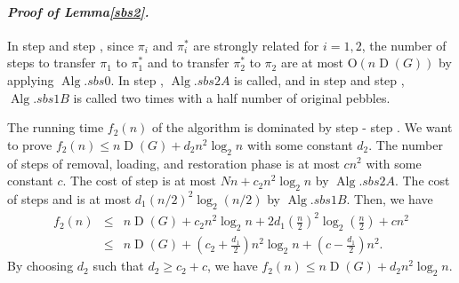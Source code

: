 \documentclass[letter,11pt]{article}
\newcommand{\white}{\qquad{\framebox{\rule{0pt}{4pt}}}}
\newcommand{\owari}{\hfill\white}
\theoremstyle{definition}
\theoremstyle{definition}
\DeclareMathOperator{\Alg}{Alg}
\DeclareMathOperator{\D}{D}
\newcommand{\1}{\boldmath$~1~$\unboldmath}
\newcommand{\Ord}{\mathrm{O}}
\newcommand{\qedgo}{\vspace{0.35cm}}
\newcommand{\tume}{\hspace*{0.2em}}
\newcommand{\maru}[1]{{\ooalign{\hfill$\small#1$\hfill\crcr\scalebox{1.3}{$\bigcirc$}}}}
\newenvironment{Proofof}[1]{\expandafter
\paragraph{{\it Proof of #1.}}}{\hspace{5mm}\owari\qedgo}
\begin{document}
\begin{Proofof}{Lemma\tume\ref{sbs2}}
In step \maru{2} and step \maru{7}, since $\pi_i$ and $\pi_i^{\ast}$ are strongly related for $i = 1, 2$, the number of steps to transfer $\pi_1$ to $\pi_1^{\ast}$ and to transfer $\pi_2^{\ast}$ to $\pi_2$ are at most $\Ord (n\D(G))$ by applying $\Alg.sbs0$.
In step \maru{3}, $\Alg.sbs2A$ is called, and 
in step \maru{4} and step \maru{5}, $\Alg.sbs1B$ is called two times with a half number of original pebbles.

The running time $f_2(n)$ of the algorithm is dominated by step \maru{3} - step \maru{6}.
We want to prove $f_2(n) \le n\D(G) + d_2 n^2 \log_2 n$ with some constant $d_2$.
The number of steps of removal, loading, and restoration phase is at most $cn^2$ with some constant $c$.
The cost of  step \maru{3} is at most $Nn + c_2 n^2 \log_2 n$ by $\Alg.sbs2A$.
The cost of  steps \maru{4} and \maru{5} is at most $d_1 (n/2)^2 \log_2 (n/2)$ by $\Alg.sbs1B$.
Then, we have
\begin{eqnarray*}
f_2(n) & \le & n\D(G) + c_2 n^2 \log_2 n + 2 d_1 (\frac{n}{2})^2 \log_2 (\frac{n}{2}) + c n^2 \\
 & \le & n\D(G) + ( c_2 + \frac{d_1}{2}) n^2 \log_2 n + (c - \frac{d_1}{2})n^2.
\end{eqnarray*} 
By choosing $d_2$ such that $d_2 \ge c_2 + c$, we have $f_2(n) \le n\D(G) + d_2 n^2 \log_2 n$.              
\end{Proofof}
\end{document}

